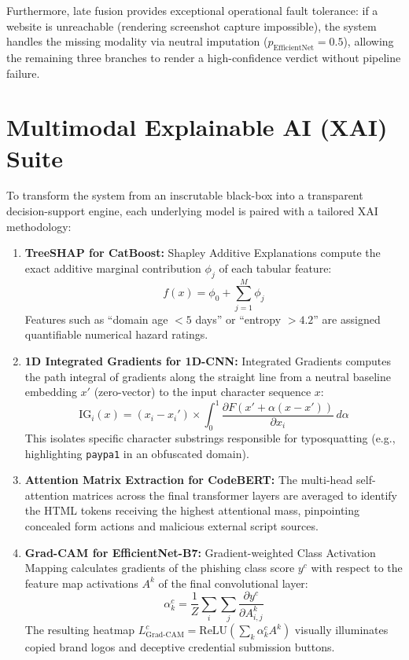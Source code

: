 Furthermore, late fusion provides exceptional operational fault tolerance: if a website is unreachable (rendering screenshot capture impossible), the system handles the missing modality via neutral imputation ($p_{\text{EfficientNet}} = 0.5$), allowing the remaining three branches to render a high-confidence verdict without pipeline failure.

\section{Multimodal Explainable AI (XAI) Suite}
To transform the system from an inscrutable black-box into a transparent decision-support engine, each underlying model is paired with a tailored XAI methodology:
\begin{enumerate}
\item \textbf{TreeSHAP for CatBoost:} Shapley Additive Explanations \cite{9} compute the exact additive marginal contribution $\phi_j$ of each tabular feature:
\begin{equation}
f(x) = \phi_0 + \sum_{j=1}^M \phi_j
\label{eq:shap}
\end{equation}
Features such as ``domain age $< 5$ days'' or ``entropy $> 4.2$'' are assigned quantifiable numerical hazard ratings.

\item \textbf{1D Integrated Gradients for 1D-CNN:} Integrated Gradients \cite{11} computes the path integral of gradients along the straight line from a neutral baseline embedding $x'$ (zero-vector) to the input character sequence $x$:
\begin{equation}
\text{IG}_i(x) = (x_i - x_i') \times \int_0^1 \frac{\partial F(x' + \alpha(x - x'))}{\partial x_i} \, d\alpha
\label{eq:ig}
\end{equation}
This isolates specific character substrings responsible for typosquatting (e.g., highlighting \texttt{paypa1} in an obfuscated domain).

\item \textbf{Attention Matrix Extraction for CodeBERT:} The multi-head self-attention matrices across the final transformer layers are averaged to identify the HTML tokens receiving the highest attentional mass, pinpointing concealed form actions and malicious external script sources.

\item \textbf{Grad-CAM for EfficientNet-B7:} Gradient-weighted Class Activation Mapping \cite{10} calculates gradients of the phishing class score $y^c$ with respect to the feature map activations $A^k$ of the final convolutional layer:
\begin{equation}
\alpha_k^c = \frac{1}{Z} \sum_i \sum_j \frac{\partial y^c}{\partial A_{i,j}^k}
\label{eq:gradcam}
\end{equation}
The resulting heatmap $L_{\text{Grad-CAM}}^c = \text{ReLU}\left(\sum_k \alpha_k^c A^k\right)$ visually illuminates copied brand logos and deceptive credential submission buttons.
\end{enumerate}

